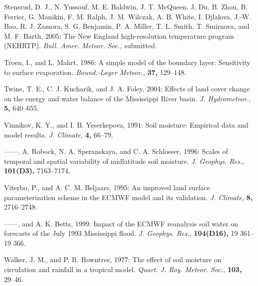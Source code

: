 \documentclass[twocolumn]{article}
\begin{document}
\begin{references}
{\item Stensrud, D. J., N. Yussouf, M. E. Baldwin, J. T. McQueen, J. Du, B. Zhou, B. Ferrier, G. Manikin, F. M. Ralph, J. M. Wilczak, A. B. White, I. Djlalova, J.-W. Bao, R. J. Zamora, S. G. Benjamin, P. A. Miller, T. L. Smith, T. Smirnova, and M. F. Barth, 2005: The New England high-resolution temperature program (NEHRTP). \textit{Bull. Amer. Meteor. Soc.,} submitted.

\vspace{0.235mm}

\item Troen, I., and L. Mahrt, 1986: A simple model of the boundary layer: Sensitivity to surface evaporation. \textit{Bound.-Layer Meteor.,} \textbf{37,} 129--148.

\vspace{0.235mm}

\item Twine, T. E., C. J. Kucharik, and J. A. Foley, 2004: Effects of land cover change on the energy and water balance of the Mississippi River basin. \textit{J. Hydrometeor.,} \textbf{5,} 640--655.

\vspace{0.235mm}

\item Vinnikov, K. Y., and I. B. Yeserkepova, 1991: Soil moisture: Empirical data and model results. \textit{J. Climate,} \textbf{4,} 66--79.

\vspace{0.235mm}

\item ------, A. Robock, N. A. Speranskaya, and C. A. Schlosser, 1996: Scales of temporal and spatial variability of midlatitude soil moisture. \textit{J. Geophys. Res.,} \textbf{101(D3),} 7163--7174.

\newpage

\item Viterbo, P., and A. C. M. Beljaars, 1995: An improved land surface parameterization scheme in the ECMWF model and its validation. \textit{J. Climate,} \textbf{8,} 2716--2748.

\item ------, and A. K. Betts, 1999: Impact of the ECMWF reanalysis soil water on forecasts of the July 1993 Mississippi flood. \textit{J. Geophys. Res.,} \textbf{104(D16),} 19 361--19 366.

\item Walker, J. M., and P. R. Rowntree, 1977: The effect of soil moisture on circulation and rainfall in a tropical model. \textit{Quart. J. Roy. Meteor. Soc.,} \textbf{103,} 29--46.

}
\end{references}
\end{document}
